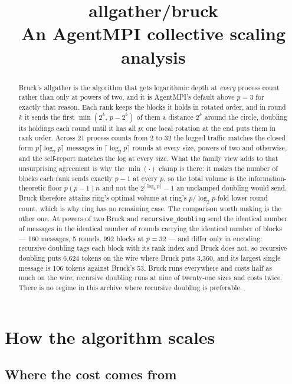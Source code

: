 \documentclass[11pt]{article}
\title{\textbf{allgather/bruck}\\[2pt]\large An AgentMPI collective scaling analysis}
\author{}
\date{}
\begin{document}
\maketitle

\begin{abstract}
Bruck's allgather is the algorithm that gets logarithmic depth at \emph{every} process count
rather than only at powers of two, and it is AgentMPI's default above $p=3$ for exactly that
reason. Each rank keeps the blocks it holds in rotated order, and in round $k$ it sends the first
$\min(2^k,\, p-2^k)$ of them a distance $2^k$ around the circle, doubling its holdings each round
until it has all $p$; one local rotation at the end puts them in rank order. Across 21 process
counts from 2 to 32 the logged traffic matches the closed form $p\lceil\log_2 p\rceil$ messages in
$\lceil\log_2 p\rceil$ rounds at every size, powers of two and otherwise, and the self-report
matches the log at every size. What the family view adds to that unsurprising agreement is why
the $\min(\cdot)$ clamp is there: it makes the number of blocks each rank sends exactly $p-1$ at
every $p$, so the total volume is the information-theoretic floor $p(p-1)n$ and not the
$2^{\lceil\log_2 p\rceil}-1$ an unclamped doubling would send. Bruck therefore attains ring's
optimal volume at ring's $p/\log_2 p$-fold lower round count, which is why ring has no remaining
case. The comparison worth making is the other one. At powers of two Bruck and
\texttt{recursive\_doubling} send the identical number of messages in the identical number of
rounds carrying the identical number of blocks --- 160 messages, 5 rounds, 992 blocks at $p=32$ ---
and differ only in encoding: recursive doubling tags each block with its rank index and Bruck
does not, so recursive doubling puts 6{,}624 tokens on the wire where Bruck puts 3{,}360, and its
largest single message is 106 tokens against Bruck's 53. Bruck runs everywhere and costs half as
much on the wire; recursive doubling runs at nine of twenty-one sizes and costs twice. There is no
regime in this archive where recursive doubling is preferable.
\end{abstract}



\section{How the algorithm scales}

\subsection{Where the cost comes from}
\end{document}
